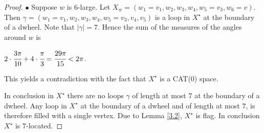 \documentclass[10pt,a4paper]{amsart}
\begin{document}
\begin{proof}
$\bullet$ Suppose $w$ is $6$-large. Let $X_{w} = (w_{1}=v_{1}, w_{2}, w_{3}, w_{4}, w_{5}=v_{3}, w_{6} = v)$. Then $\gamma =(w_{1}=v_{1}, w_{2}, w_{3}, w_{4}, w_{5} = v_{3}, v_{4}, v_{5})$ is a loop in $X^{\star}$ at the boundary of a dwheel. Note that $|\gamma| = 7$. Hence the sum of the measures of the angles around $w$ is
\begin{center}
$2 \cdot \cfrac{3 \pi}{10} + 4 \cdot \cfrac{\pi}{3} = \cfrac{29 \pi}{15} < 2 \pi$.\end{center} This yields a contradiction with the fact that $X^{\star}$ is a CAT(0) space.

In conclusion in $X^{\star}$ there are no loops $\gamma$ of length at most $7$ at the boundary of a dwheel. Any loop in $X^{\star}$ at the boundary of a dwheel and of length at most $7$, is therefore filled with a single vertex. Due to Lemma \ref{3.2}, $X^{\star}$ is flag. In conclusion $X^{\star}$ is $7$-located.



\end{proof}
\end{document}
